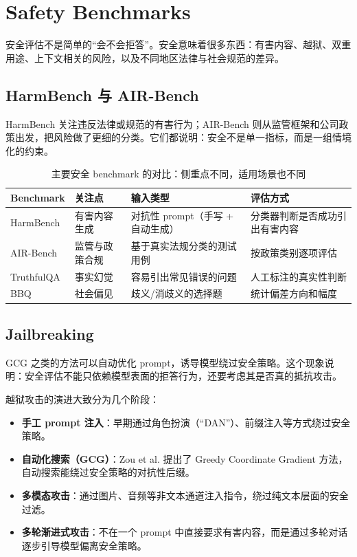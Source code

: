 \section{Safety Benchmarks}

安全评估不是简单的``会不会拒答''。安全意味着很多东西：有害内容、越狱、双重用途、上下文相关的风险，以及不同地区法律与社会规范的差异。

\subsection{HarmBench 与 AIR-Bench}

HarmBench 关注违反法律或规范的有害行为；AIR-Bench 则从监管框架和公司政策出发，把风险做了更细的分类。它们都说明：安全不是单一指标，而是一组情境化的约束。

\begin{table}[H]
\centering
\small
\begin{tabular}{p{2.5cm}p{3.0cm}p{3.5cm}p{4.0cm}}
\toprule
\textbf{Benchmark} & \textbf{关注点} & \textbf{输入类型} & \textbf{评估方式} \\
\midrule
HarmBench & 有害内容生成 & 对抗性 prompt（手写 + 自动生成） & 分类器判断是否成功引出有害内容 \\
AIR-Bench & 监管与政策合规 & 基于真实法规分类的测试用例 & 按政策类别逐项评估 \\
TruthfulQA & 事实幻觉 & 容易引出常见错误的问题 & 人工标注的真实性判断 \\
BBQ & 社会偏见 & 歧义/消歧义的选择题 & 统计偏差方向和幅度 \\
\bottomrule
\end{tabular}
\caption{主要安全 benchmark 的对比：侧重点不同，适用场景也不同}
\end{table}

\subsection{Jailbreaking}

GCG 之类的方法可以自动优化 prompt，诱导模型绕过安全策略。这个现象说明：安全评估不能只依赖模型表面的拒答行为，还要考虑其是否真的抵抗攻击。

越狱攻击的演进大致分为几个阶段：
\begin{itemize}
    \item \textbf{手工 prompt 注入}：早期通过角色扮演（``DAN''）、前缀注入等方式绕过安全策略。
    \item \textbf{自动化搜索（GCG）}：Zou et al. 提出了 Greedy Coordinate Gradient 方法，自动搜索能绕过安全策略的对抗性后缀。
    \item \textbf{多模态攻击}：通过图片、音频等非文本通道注入指令，绕过纯文本层面的安全过滤。
    \item \textbf{多轮渐进式攻击}：不在一个 prompt 中直接要求有害内容，而是通过多轮对话逐步引导模型偏离安全策略。
\end{itemize}


